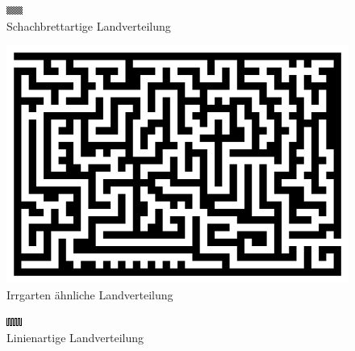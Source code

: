 \documentclass[a4paper,12pt]{article}
\begin{document}
\begin{figure}[H]
\centering
    \includegraphics[width=0.7\linewidth]{Bilder/Aufgabe3/Teilaufgabe_D/schachbrett.png}
    \caption{Schachbrettartige Landverteilung}
\end{figure}
\begin{figure}[H]
\centering
    \includegraphics[width=0.7\linewidth]{Bilder/Aufgabe3/Teilaufgabe_D/irrgarten.png}
    \caption{Irrgarten ähnliche Landverteilung}
\end{figure}
\begin{figure}[H]
\centering
    \includegraphics[width=0.7\linewidth]{Bilder/Aufgabe3/Teilaufgabe_D/linien.png}
    \caption{Linienartige Landverteilung}
\end{figure}


\end{document}
